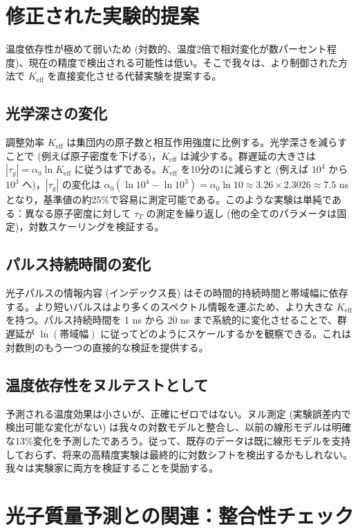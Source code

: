 \documentclass[12pt,a4paper]{article}
\newcommand{\Keff}{K_{\mathrm{eff}}}
\begin{document}
	\section{修正された実験的提案}
	
	温度依存性が極めて弱いため (対数的、温度2倍で相対変化が数パーセント程度)、現在の精度で検出される可能性は低い。そこで我々は、より制御された方法で \(\Keff\) を直接変化させる代替実験を提案する。
	
	\subsection{光学深さの変化}
	
	調整効率 \(\Keff\) は集団内の原子数と相互作用強度に比例する。光学深さを減らすことで (例えば原子密度を下げる)，\(\Keff\) は減少する。群遅延の大きさは \(|\tau_g| = \alpha_0 \ln\Keff\) に従うはずである。\(\Keff\) を10分の1に減らすと (例えば \(10^4\) から \(10^3\) へ)，\(|\tau_g|\) の変化は \(\alpha_0 (\ln 10^4 - \ln 10^3) = \alpha_0 \ln 10 \approx 3.26 \times 2.3026 \approx 7.5\) ns となり，基準値の約25\%で容易に測定可能である。このような実験は単純である：異なる原子密度に対して \(\tau_T\) の測定を繰り返し (他の全てのパラメータは固定)，対数スケーリングを検証する。
	
	\subsection{パルス持続時間の変化}
	
	光子パルスの情報内容 (インデックス長) はその時間的持続時間と帯域幅に依存する。より短いパルスはより多くのスペクトル情報を運ぶため、より大きな \(\Keff\) を持つ。パルス持続時間を 1 ns から 20 ns まで系統的に変化させることで、群遅延が \(\ln(\text{帯域幅})\) に従ってどのようにスケールするかを観察できる。これは対数則のもう一つの直接的な検証を提供する。
	
	\subsection{温度依存性をヌルテストとして}
	
	予測される温度効果は小さいが、正確にゼロではない。ヌル測定 (実験誤差内で検出可能な変化がない) は我々の対数モデルと整合し、以前の線形モデルは明確な13\%変化を予測したであろう。従って、既存のデータは既に線形モデルを支持しておらず、将来の高精度実験は最終的に対数シフトを検出するかもしれない。我々は実験家に両方を検証することを奨励する。
	
	\section{光子質量予測との関連：整合性チェック}
	\label{sec:photon_mass_consistency}
	
\end{document}

